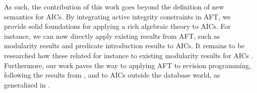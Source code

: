 
As such, the contribution of this work goes beyond the definition of new semantics for AICs. 
By integrating active integrity constraints in AFT, we provide solid foundations for applying a rich algebraic theory to AICs.
For instance, we can now directly apply existing results from AFT, such as modularity results and predicate introduction results to AICs. 
It remains to be researched how these related for instance to existing modularity results for AICs \cite{foiks/Cruz-Filipe14,iclp/Cruz-Filipe16}. 
Furthermore, our work paves the way to applying AFT to revision programming, following the results from \citet{tplp/CaropreseT11}, and to AICs outside the database world, as generalized in \citet{ekaw/Cruz-Filipe16}.


